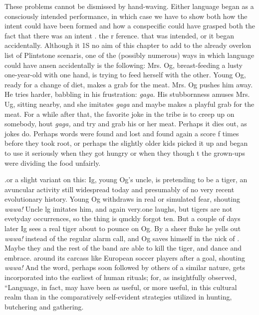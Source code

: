 
These problems cannot be dismissed by hand-waving. Either language began as a consciously intended performance, in which case we have to show both how the intent could have been formed and how a conspecific could have grasped both the fact that there was an intent .{\textquotedbl} the r ference. that was intended, or it began accidentally. Although it 1S no aim of this chapter to add to the already overlon list of Plint\-stone scenaris, one of the (possibly numerous) ways in which language could have ansen accidentally is the following: Mrs. Og, breast-feeding a lusty one-year-old with one hand, is trying to feed herself with the other. Young Og, ready for a change of diet, makes a grab for the meat. Mrs. Og pushes him away. He tries harder, babbling in his frustra\-tion: \textit{gaga.} His stubbornness amuses Mrs. Ug, sitting nearby, and she imitates \textit{gaga} and maybe makes a playful grab for the meat. For a while after that, the favorite joke in the tribe is to creep up on somebody, hout \textit{gaga, }and try and grab his or her meat. Perhaps it dies out, as jokes do. Perhaps words were found and lost and found again a score f times before they took root, or perhaps the slightly older kids picked
it up and began to use it seriously when they got hungry or when they though t the grown-ups were dividing the food unfairly.

.or a slight variant on this: Ig, young Og's uncle, is pretending to be a tiger, an avuncular activity still widespread today and presumably of no very recent evolutionary history. Young Og withdraws in real or simulated fear, shouting \textit{wawa!} Uncle lg imitates him, and again very.one laughs, but tigers are not evetyday occurrences, so the thing is qmckly forgot ten. But a couple of days later Ig sees a real tiger about to pounce on Og. By a sheer fluke he yells out \textit{wawa!} instead of the regular alarm call, and Og saves himself in the nick of . Maybe they and the rest of the band are able to kill the tiger, and dance and em\-brace. around its carcass like European soccer players after a goal, shouting \textit{wawa! }And the word, perhaps soon followed by others of a
similar nature, gets incorporated into the earliest of human rituals; for, as \citet{Marshack1976} insightfully observed, ``Language, in fact, may have been as useful, or more useful, in this cultural realm than in the
comparatively self-evident strategies utilized in hunting, butchering and gathering.{\textquotedbl}

